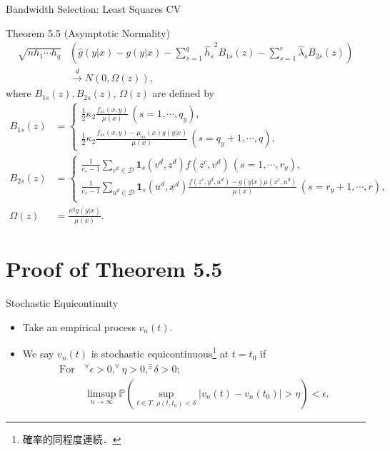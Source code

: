 \documentclass[xcolor=svgnames,dvipdfmx,cjk]{beamer}
\theoremstyle{example}
\begin{document}
\begin{frame}{Bandwidth Selection: Least Squares CV}
  \begin{itembox}[l]{Theorem 5.5 (Asymptotic Normality)}
    \begin{align*}
      \sqrt{n h_1 \cdots h_q} 
      &\left(
        \hat{g}(y|x) - g(y|x) 
         - \sum_{s=1}^{q} {\hat{h}_s}^2 B_{1s}(z)
         - \sum_{s=1}^{r} \hat{\lambda}_s B_{2s}(z)
      \right) \\
      &\xrightarrow{d} N (0, \Omega(z)),
    \end{align*}
   where $B_{1s}(z), B_{2s}(z)$, $\Omega(z)$ are defined by
    \begin{align*}
      B_{1s}(z) &=
      \left\{
            \begin{array}{l}
                \frac{1}{2} \kappa_2 \frac{f_{ss}(x,y)}{\mu(x)}\, 
                (s = 1,\cdots, q_y) , \\
                \frac{1}{2} \kappa_2 \frac{f_{ss}(x,y) - \mu_{ss}(x)g(y|x)}{\mu(x)}\,
                (s = q_y+1 , \cdots , q),
            \end{array}
       \right. \\
      B_{2s}(z) &=
       \left\{
            \begin{array}{l}
                \frac{1}{c_s-1} \sum_{v^d \in \mathcal{D}}
                \mathbf{1}_s(v^d,z^d)f(z^c,v^d)\,
                (s = 1, \cdots , r_y), \\
                \frac{1}{c_s-1} \sum_{u^d \in \mathcal{D}}
                \mathbf{1}_s(u^d,x^d) 
                \frac{f(z^c,y^d,u^d) - g(y|x)\mu(x^c,u^d)}{\mu(x)}\,
                (s = r_y+1, \cdots , r), \\
            \end{array}
       \right. \\
       \Omega(z) &= \frac{\kappa^q g(y|x)}{\mu(x)}.
    \end{align*}
  \end{itembox}
\end{frame}

\section{Proof of Theorem 5.5}

\begin{frame}{Stochastic Equicontinuity}
  \begin{itemize}
    \item Take an empirical process ${v}_n(t)$. 
    \item We say $v_n(t)$ is stochastic equicontinuous\footnote{確率的同程度連続．} at $t=t_0$ if
          \begin{align*}
            \text{For} \, & ^{\forall}\epsilon>0, ^{\forall}\eta>0,  ^{\exists}\delta>0; \\
                          & \limsup_{n \to \infty} \mathbb{P} \left(
                            \sup_{t \in T, \, \rho(t, t_0)<\delta} |v_n(t)-v_n(t_0)|>\eta  
                          \right) 
                          < \epsilon .
          \end{align*}
  \end{itemize}
\end{frame}
\end{document}
